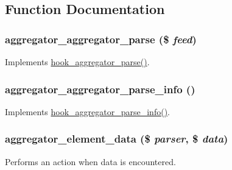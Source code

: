 \subsection{Function Documentation}
\hypertarget{aggregator_8parser_8inc_ae8ba62e5e5e4f942b3b003d91cd50d03}{
\subsubsection[{aggregator\_\-aggregator\_\-parse}]{\setlength{\rightskip}{0pt plus 5cm}aggregator\_\-aggregator\_\-parse (\$ {\em feed})}}
\label{aggregator_8parser_8inc_ae8ba62e5e5e4f942b3b003d91cd50d03}
Implements \hyperlink{group__hooks_gae27163e729bb531cc527ec6f0ad16943}{hook\_\-aggregator\_\-parse()}. \hypertarget{aggregator_8parser_8inc_a394093a4e5442f7e9e842a1103721263}{
\subsubsection[{aggregator\_\-aggregator\_\-parse\_\-info}]{\setlength{\rightskip}{0pt plus 5cm}aggregator\_\-aggregator\_\-parse\_\-info ()}}
\label{aggregator_8parser_8inc_a394093a4e5442f7e9e842a1103721263}
Implements \hyperlink{group__hooks_ga4cf79b336cf009dee9487ae9d2249d9d}{hook\_\-aggregator\_\-parse\_\-info()}. \hypertarget{aggregator_8parser_8inc_a2bc15daa011069466cc88faa83ded5fc}{
\subsubsection[{aggregator\_\-element\_\-data}]{\setlength{\rightskip}{0pt plus 5cm}aggregator\_\-element\_\-data (\$ {\em parser}, \/  \$ {\em data})}}
\label{aggregator_8parser_8inc_a2bc15daa011069466cc88faa83ded5fc}
Performs an action when data is encountered.

